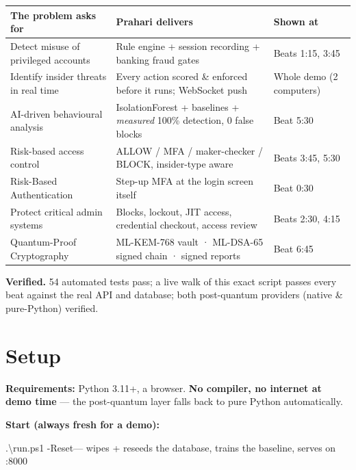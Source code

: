 \documentclass[11pt]{article}
\newcommand{\code}[1]{{\ttfamily\color{navy2}#1}}
\begin{document}
\begin{center}\small
\begin{tabular}{L{5.4cm} L{5.2cm} L{3.6cm}}
\toprule
{}\textbf{\color{white}The problem asks for} & \textbf{\color{white}Prahari delivers} & \textbf{\color{white}Shown at} \\
\midrule
Detect misuse of privileged accounts & Rule engine + session recording + banking fraud gates & Beats 1:15, 3:45 \\
Identify insider threats in real time & Every action scored \& enforced before it runs; WebSocket push & Whole demo (2 computers) \\
AI-driven behavioural analysis & IsolationForest + baselines + \emph{measured} 100\% detection, 0 false blocks & Beat 5:30 \\
Risk-based access control & ALLOW / MFA / maker-checker / BLOCK, insider-type aware & Beats 3:45, 5:30 \\
Risk-Based Authentication & Step-up MFA at the login screen itself & Beat 0:30 \\
Protect critical admin systems & Blocks, lockout, JIT access, credential checkout, access review & Beats 2:30, 4:15 \\
Quantum-Proof Cryptography & ML-KEM-768 vault · ML-DSA-65 signed chain · signed reports & Beat 6:45 \\
\bottomrule
\end{tabular}
\end{center}

\begin{tipbox}
\textbf{Verified.} 54 automated tests pass; a live walk of this exact script passes every beat against
the real API and database; both post-quantum providers (native \& pure-Python) verified.
\end{tipbox}

\section{Setup}

\textbf{Requirements:} Python 3.11+, a browser. \textbf{No compiler, no internet at demo time} — the
post-quantum layer falls back to pure Python automatically.

\textbf{Start (always fresh for a demo):}
\begin{center}
\code{.\textbackslash run.ps1 -Reset}\quad — wipes + reseeds the database, trains the baseline, serves on \code{:8000}
\end{center}
\end{document}

